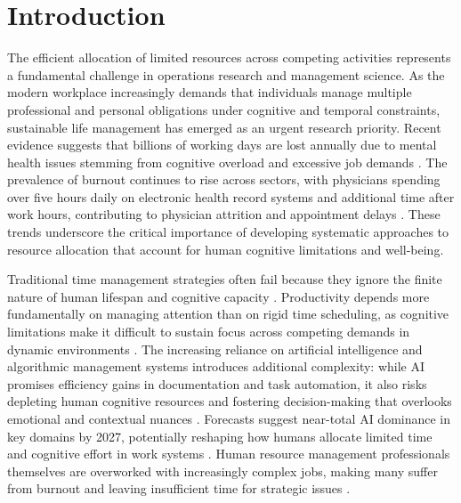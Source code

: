 \documentclass[preprint,review,11pt]{elsarticle}
\begin{document}

\section{Introduction}

The efficient allocation of limited resources across competing activities represents a fundamental challenge in operations research and management science. As the modern workplace increasingly demands that individuals manage multiple professional and personal obligations under cognitive and temporal constraints, sustainable life management has emerged as an urgent research priority. Recent evidence suggests that billions of working days are lost annually due to mental health issues stemming from cognitive overload and excessive job demands \citep{Robinson2024}. The prevalence of burnout continues to rise across sectors, with physicians spending over five hours daily on electronic health record systems and additional time after work hours, contributing to physician attrition and appointment delays \citep{celik_frontiers_2024}. These trends underscore the critical importance of developing systematic approaches to resource allocation that account for human cognitive limitations and well-being.

Traditional time management strategies often fail because they ignore the finite nature of human lifespan and cognitive capacity \citep{Hart2024}. Productivity depends more fundamentally on managing attention than on rigid time scheduling, as cognitive limitations make it difficult to sustain focus across competing demands in dynamic environments \citep{Grant2019}. The increasing reliance on artificial intelligence and algorithmic management systems introduces additional complexity: while AI promises efficiency gains in documentation and task automation, it also risks depleting human cognitive resources and fostering decision-making that overlooks emotional and contextual nuances \citep{Reinhart2025}. Forecasts suggest near-total AI dominance in key domains by 2027, potentially reshaping how humans allocate limited time and cognitive effort in work systems \citep{Douthat2025}. Human resource management professionals themselves are overworked with increasingly complex jobs, making many suffer from burnout and leaving insufficient time for strategic issues \citep{aguinis_how_2024}.
\end{document}
